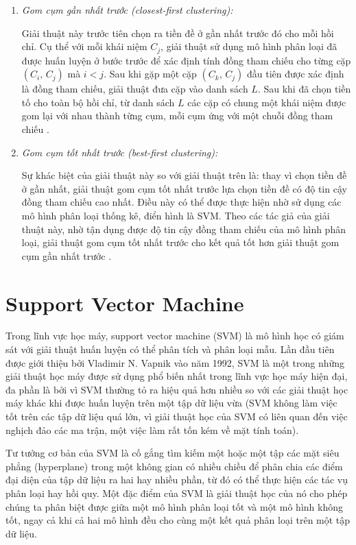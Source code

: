 \begin{enumerate}[parsep=0pt]
\item \emph{Gom cụm gần nhất trước (closest-first clustering):}

Giải thuật này trước tiên chọn ra tiền đề ở gần nhất trước đó cho mỗi hồi chỉ. Cụ thể với mỗi khái niệm $C_j$, giải thuật sử dụng mô hình phân loại đã được huấn luyện ở bước trước để xác định tính đồng tham chiếu cho từng cặp $(C_i,\,C_j)$ mà $i<j$. Sau khi gặp một cặp $(C_k,\,C_j)$ đầu tiên được xác định là đồng tham chiếu, giải thuật đưa cặp vào danh sách $L$. Sau khi đã chọn tiền tố cho toàn bộ hồi chỉ, từ danh sách $L$ các cặp có chung một khái niệm được gom lại với nhau thành từng cụm, mỗi cụm ứng với một chuỗi đồng tham chiếu \cite{Soon2001}.
\item \emph{Gom cụm tốt nhất trước (best-first clustering):}

Sự khác biệt của giải thuật này so với giải thuật trên là: thay vì chọn tiền đề ở gần nhất, giải thuật gom cụm tốt nhất trước lựa chọn tiền đề có độ tin cậy đồng tham chiếu cao nhất. Điều này có thể được thực hiện nhờ sử dụng các mô hình phân loại thống kê, điển hình là SVM. Theo các tác giả của giải thuật này, nhờ tận dụng được độ tin cậy đồng tham chiếu của mô hình phân loại, giải thuật gom cụm tốt nhất trước cho kết quả tốt hơn giải thuật gom cụm gần nhất trước \cite{VincentNg2002a}.
\end{enumerate}

\section{Support Vector Machine}
Trong lĩnh vực học máy, support vector machine (SVM) là mô hình học có giám sát với giải thuật huấn luyện có thể phân tích và phân loại mẫu. Lần đầu tiên được giới thiệu bởi Vladimir N. Vapnik vào năm 1992, SVM là một trong những giải thuật học máy được sử dụng phổ biến nhất trong lĩnh vực học máy hiện đại, đa phần là bởi vì SVM thường tỏ ra hiệu quả hơn nhiều so với các giải thuật học máy khác khi được huấn luyện trên một tập dữ liệu vừa (SVM không làm việc tốt trên các tập dữ liệu quá lớn, vì giải thuật học của SVM có liên quan đến việc nghịch đảo các ma trận, một việc làm rất tốn kém về mặt tính toán). 

Tư tưởng cơ bản của SVM là cố gắng tìm kiếm một hoặc một tập các mặt siêu phẳng (hyperplane) trong một không gian có nhiều chiều để phân chia các điểm đại diện của tập dữ liệu ra hai hay nhiều phần, từ đó có thể thực hiện các tác vụ phân loại hay hồi quy. Một đặc điểm của SVM là giải thuật học của nó cho phép chúng ta phân biệt được giữa một mô hình phân loại tốt và một mô hình không tốt, ngay cả khi cả hai mô hình đều cho cùng một kết quả phân loại trên một tập dữ liệu.

